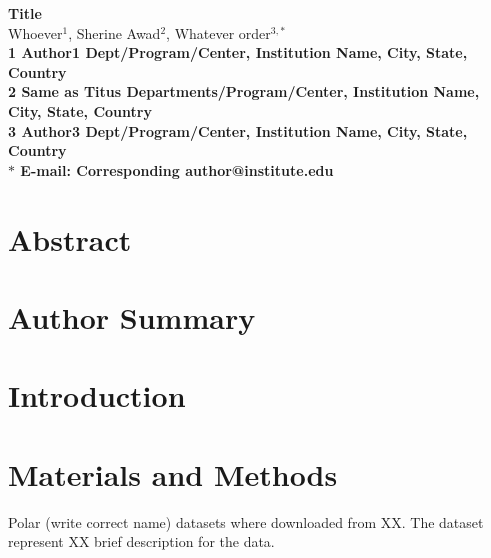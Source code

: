 





\begin{flushleft}
{\Large
\textbf{Title}
}
\\
Whoever$^{1}$, 
Sherine Awad$^{2}$, 
Whatever order$^{3,\ast}$
\\
\bf{1} Author1  Dept/Program/Center, Institution Name, City, State, Country
\\
\bf{2} Same as Titus Departments/Program/Center, Institution Name, City, State, Country
\\
\bf{3} Author3 Dept/Program/Center, Institution Name, City, State, Country
\\
$\ast$ E-mail: Corresponding author@institute.edu
\end{flushleft}

\section*{Abstract}

\section*{Author Summary}



\section*{Introduction}




\section*{Materials and Methods}
Polar (write correct name) datasets where downloaded from XX. The dataset represent XX brief description for the data. 

